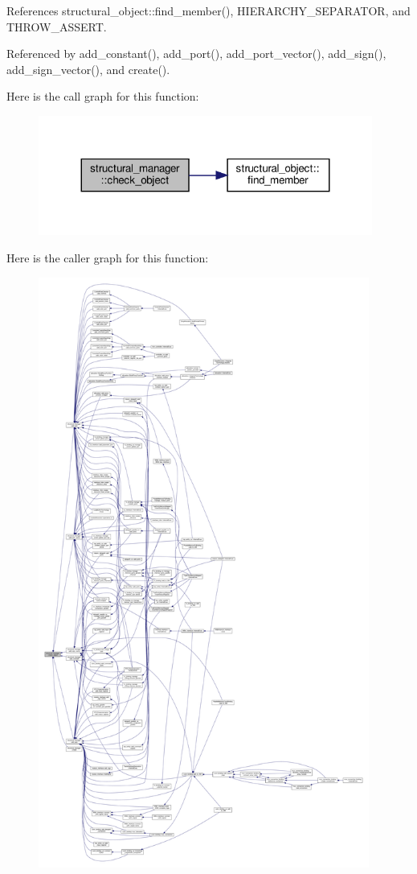 References structural\+\_\+object\+::find\+\_\+member(), H\+I\+E\+R\+A\+R\+C\+H\+Y\+\_\+\+S\+E\+P\+A\+R\+A\+T\+OR, and T\+H\+R\+O\+W\+\_\+\+A\+S\+S\+E\+RT.



Referenced by add\+\_\+constant(), add\+\_\+port(), add\+\_\+port\+\_\+vector(), add\+\_\+sign(), add\+\_\+sign\+\_\+vector(), and create().

Here is the call graph for this function\+:
\nopagebreak
\begin{figure}[H]
\begin{center}
\leavevmode
\includegraphics[width=311pt]{d7/d6b/classstructural__manager_a9fbb1019c9ffe7b78303ce0d85200ad6_cgraph}
\end{center}
\end{figure}
Here is the caller graph for this function\+:
\nopagebreak
\begin{figure}[H]
\begin{center}
\leavevmode
\includegraphics[height=550pt]{d7/d6b/classstructural__manager_a9fbb1019c9ffe7b78303ce0d85200ad6_icgraph}
\end{center}
\end{figure}
